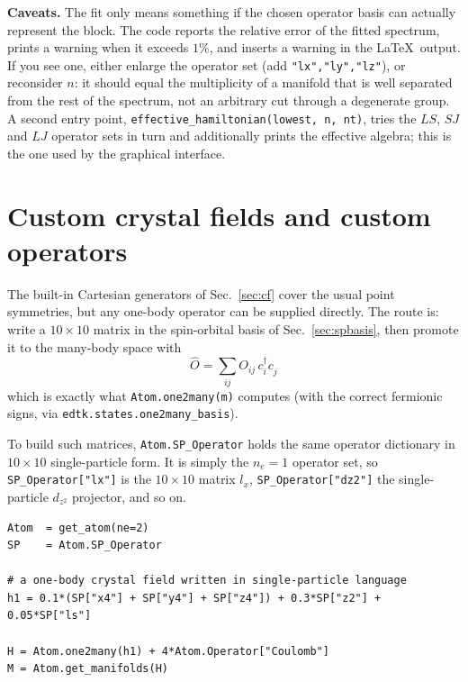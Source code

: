 \documentclass[11pt,a4paper]{article}
\newcommand{\op}[1]{\texttt{#1}}
\newcommand{\cd}[1]{c^{\dagger}_{#1}}
\newcommand{\cc}[1]{c^{\phantom{\dagger}}_{#1}}
\begin{document}
\noindent
\textbf{Caveats.}  The fit only means something if the chosen operator basis can
actually represent the block.  The code reports the relative error of the fitted
spectrum, prints a warning when it exceeds $1\%$, and inserts a warning in the
\LaTeX\ output.  If you see one, either enlarge the operator set (add
\op{"lx","ly","lz"}), or reconsider $n$: it should equal the multiplicity of a
manifold that is well separated from the rest of the spectrum, not an arbitrary
cut through a degenerate group.  A second entry point,
\op{effective\_hamiltonian(lowest, n, nt)}, tries the $LS$, $SJ$ and $LJ$
operator sets in turn and additionally prints the effective algebra; this is the
one used by the graphical interface.

\section{Custom crystal fields and custom operators}
\label{sec:custom}

The built-in Cartesian generators of Sec.~\ref{sec:cf} cover the usual point
symmetries, but any one-body operator can be supplied directly.  The route is:
write a $10\times 10$ matrix in the spin-orbital basis of Sec.~\ref{sec:spbasis},
then promote
it to the many-body space with
\begin{equation}
  \hat O = \sum_{ij} O_{ij}\, \cd{i}\cc{j}
\end{equation}
which is exactly what \op{Atom.one2many(m)} computes (with the correct fermionic
signs, via \op{edtk.states.one2many\_basis}).

To build such matrices, \op{Atom.SP\_Operator} holds the same operator
dictionary in $10\times 10$ single-particle form.  It is simply the $n_e=1$
operator set, so \op{SP\_Operator["lx"]} is the $10\times 10$ matrix $l_x$,
\op{SP\_Operator["dz2"]} the single-particle $d_{z^2}$ projector, and so on.

\begin{lstlisting}
Atom  = get_atom(ne=2)
SP    = Atom.SP_Operator

# a one-body crystal field written in single-particle language
h1 = 0.1*(SP["x4"] + SP["y4"] + SP["z4"]) + 0.3*SP["z2"] + 0.05*SP["ls"]

H = Atom.one2many(h1) + 4*Atom.Operator["Coulomb"]
M = Atom.get_manifolds(H)
\end{lstlisting}
\end{document}
